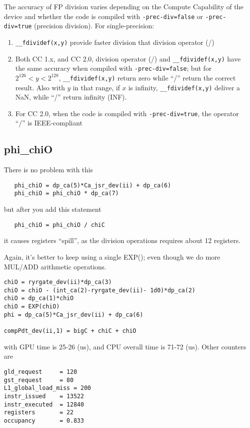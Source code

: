 The accuracy of FP division varies depending on the Compute Capability
of the device and whether the code is compiled with
\verb!-prec-div=false! or \verb!-prec-div=true! (precision division).
For single-precision:
\begin{enumerate}
\item \verb!__fdividef(x,y)! provide faster division that division
  operator (/)

\item Both CC 1.x, and CC 2.0, division operator (/) and
  \verb!__fdividef(x,y)! have the same accuracy when compiled with
  \verb!-prec-div=false!; but for $2^{126}<y<2^{128}$,
  \verb!__fdividef(x,y)! return zero while ``/'' return the correct
  result. Also with $y$ in that range, if $x$ is infinity,
  \verb!__fdividef(x,y)! deliver a NaN, while ``/'' return infinity
  (INF). 

\item For CC 2.0, when the code is compiled with
  \verb!-prec-div=true!, the operator ``/'' is IEEE-compliant
\end{enumerate}


\subsection{phi\_chiO}
\label{sec:phi_chio}

There is no problem with this
\begin{verbatim}
   phi_chiO = dp_ca(5)*Ca_jsr_dev(ii) + dp_ca(6)
   phi_chiO = phi_chiO * dp_ca(7)
\end{verbatim}
but after you add this statement
\begin{verbatim}
   phi_chiO = phi_chiO / chiC 
\end{verbatim}
it causes registers ``spill'', as the division operations requires
about 12 registers. 

Again, it's better to keep using a single EXP(); even though we do
more MUL/ADD arithmetic operations.
\begin{verbatim}
chiO = ryrgate_dev(ii)*dp_ca(3)
chiO = chiO - (int_ca(2)-ryrgate_dev(ii)- 1d0)*dp_ca(2)
chiO = dp_ca(1)*chiO
chiO = EXP(chiO)
phi = dp_ca(5)*Ca_jsr_dev(ii) + dp_ca(6)

compPdt_dev(ii,1) = bigC + chiC + chiO
\end{verbatim}
with GPU time is 25-26 (us), and CPU overall time is 71-72 (us). Other
counters are
\begin{verbatim}
gld_request     = 120
gst_request     = 80 
L1_global_load_miss = 200
instr_issued    = 13522
instr_executed  = 12840
registers       = 22
occupancy       = 0.833
\end{verbatim}


